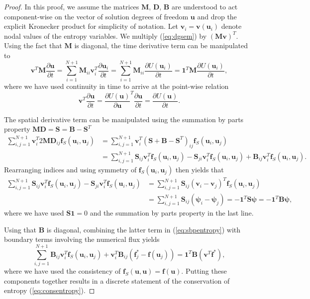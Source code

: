 \documentclass[preprint,10pt]{elsarticle}
\theoremstyle{definition}
\theoremstyle{lemma}
\theoremstyle{theorem}
\theoremstyle{assumption}
\newcommand{\pd}[2]{\frac{\partial#1}{\partial#2}}
\newcommand{\LRp}[1]{\left( #1 \right)}
\begin{document}
\begin{proof}
In this proof, we assume the matrices $\bm{M}$, $\bm{D}$, $\bm{B}$ are understood to act component-wise on the vector of solution degrees of freedom $\bm{u}$ and drop the explicit Kronecker product for simplicity of notation.  Let $\bm{v}_i = \bm{v}(\bm{u}_i)$ denote nodal values of the entropy variables.  We multiply (\ref{eq:dgsem}) by $\LRp{\bm{M}\bm{v}}^T$.  
Using the fact that $\bm{M}$ is diagonal, the time derivative term can be manipulated to 
\[
\bm{v}^T\bm{M}\pd{\bm{u}}{t} = \sum_{i=1}^{N+1} \bm{M}_{ii} \bm{v}_i^T \pd{\bm{u}_i}{t} = \sum_{i=1}^{N+1} \bm{M}_{ii} \pd{U(\bm{u}_i)}{t} = \bm{1}^T\bm{M}\pd{U(\bm{u}_i)}{t},
\]
where we have used continuity in time to arrive at the point-wise relation 
\[
\bm{v}^T \pd{\bm{u}}{t} = \pd{U(\bm{u})}{\bm{u}}^T \pd{\bm{u}}{t} = \pd{U(\bm{u})}{t}.
\]

The spatial derivative term can be manipulated using the summation by parts property $\bm{M}\bm{D} = \bm{S} = \bm{B}-\bm{S}^T$
\begin{align}
\sum_{i,j=1}^{N+1} \bm{v}_i^T 2 \bm{M}\bm{D}_{ij}\bm{f}_S(\bm{u}_i,\bm{u}_j) &= \sum_{i,j=1}^{N+1} \bm{v}_i^T (\bm{S} + \bm{B} - \bm{S}^T)_{ij}\bm{f}_S(\bm{u}_i,\bm{u}_j) \nonumber\\
&= \sum_{i,j=1}^{N+1} \bm{S}_{ij}\bm{v}_i^T \bm{f}_S(\bm{u}_i,\bm{u}_j) - \bm{S}_{ji}\bm{v}_i^T \bm{f}_S(\bm{u}_i,\bm{u}_j) + \bm{B}_{ij}\bm{v}_i^T \bm{f}_S(\bm{u}_i,\bm{u}_j). \label{eq:sbpentropy}
\end{align}
Rearranging indices and using symmetry of $\bm{f}_S(\bm{u}_i,\bm{u}_j)$ then yields that
\begin{align*}
\sum_{i,j=1}^{N+1} \bm{S}_{ij}\bm{v}_i^T \bm{f}_S(\bm{u}_i,\bm{u}_j) - \bm{S}_{ji}\bm{v}_i^T \bm{f}_S(\bm{u}_i,\bm{u}_j) &= \sum_{i,j=1}^{N+1} \bm{S}_{ij} \LRp{\bm{v}_i - \bm{v}_j}^T\bm{f}_S(\bm{u}_i,\bm{u}_j)\\
&= \sum_{i,j=1}^{N+1} \bm{S}_{ij} \LRp{\bm{\psi}_i-\bm{\psi}_j} = -\bm{1}^T \bm{S}\bm{\psi} = -\bm{1}^T\bm{B}\bm{\psi},
\end{align*}
where we have used $\bm{S}\bm{1} = 0$ and the summation by parts property in the last line.  

Using that $\bm{B}$ is diagonal, combining the latter term in (\ref{eq:sbpentropy}) with boundary terms involving the numerical flux yields
\[
\sum_{i,j = 1}^{N+1} \bm{B}_{ij}\bm{v}_i^T \bm{f}_S(\bm{u}_i,\bm{u}_j) + \bm{v}_i^T\bm{B}_{ij}\LRp{\bm{f}_j^* - \bm{f}(\bm{u}_j)} = \bm{1}^T\bm{B} \LRp{\bm{v}^T \bm{f}^*},
\]
where we have used the consistency of $\bm{f}_S(\bm{u},\bm{u}) = \bm{f}(\bm{u})$.  Putting these components together results in a discrete statement of the conservation of entropy (\ref{eq:consentropy}).   
\end{proof}
\end{document}
